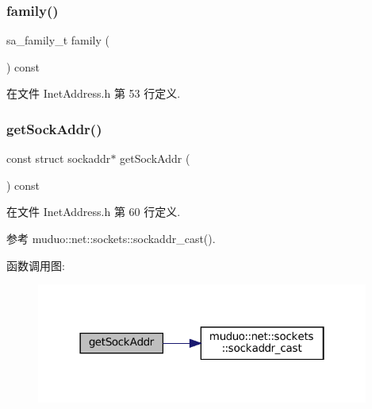 \subsubsection{\texorpdfstring{family()}{family()}}
{\footnotesize\ttfamily sa\+\_\+family\+\_\+t family (\begin{DoxyParamCaption}{ }\end{DoxyParamCaption}) const\hspace{0.3cm}{\ttfamily [inline]}}



在文件 Inet\+Address.\+h 第 53 行定义.

\mbox{\label{classmuduo_1_1net_1_1InetAddress_ab5cafd18573e44504d4134b12b2fd796}} 
\subsubsection{\texorpdfstring{get\+Sock\+Addr()}{getSockAddr()}}
{\footnotesize\ttfamily const struct sockaddr$\ast$ get\+Sock\+Addr (\begin{DoxyParamCaption}{ }\end{DoxyParamCaption}) const\hspace{0.3cm}{\ttfamily [inline]}}



在文件 Inet\+Address.\+h 第 60 行定义.



参考 muduo\+::net\+::sockets\+::sockaddr\+\_\+cast().

函数调用图\+:
\nopagebreak
\begin{figure}[H]
\begin{center}
\leavevmode
\includegraphics[width=310pt]{classmuduo_1_1net_1_1InetAddress_ab5cafd18573e44504d4134b12b2fd796_cgraph}
\end{center}
\end{figure}
\mbox{\label{classmuduo_1_1net_1_1InetAddress_a0f3b1573a23312af5b1f3edd83cc394f}} 
